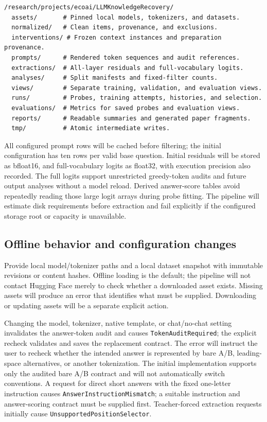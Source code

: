 \documentclass[11pt]{article}
\begin{document}
\begin{verbatim}
/research/projects/ecoai/LLMKnowledgeRecovery/
  assets/       # Pinned local models, tokenizers, and datasets.
  normalized/   # Clean items, provenance, and exclusions.
  interventions/ # Frozen context instances and preparation provenance.
  prompts/      # Rendered token sequences and audit references.
  extractions/  # All-layer residuals and full-vocabulary logits.
  analyses/     # Split manifests and fixed-filter counts.
  views/        # Separate training, validation, and evaluation views.
  runs/         # Probes, training attempts, histories, and selection.
  evaluations/  # Metrics for saved probes and evaluation views.
  reports/      # Readable summaries and generated paper fragments.
  tmp/          # Atomic intermediate writes.
\end{verbatim}
All configured prompt rows will be cached before filtering; the initial configuration has ten rows per valid base question.
Initial residuals will be stored as bfloat16, and full-vocabulary logits as float32, with execution precision also recorded.
The full logits support unrestricted greedy-token audits and future output analyses without a model reload.
Derived answer-score tables avoid repeatedly reading those large logit arrays during probe fitting.
The pipeline will estimate disk requirements before extraction and fail explicitly if the configured storage root or capacity is unavailable.

\subsection*{Offline behavior and configuration changes}

Provide local model/tokenizer paths and a local dataset snapshot with immutable revisions or content hashes.
Offline loading is the default; the pipeline will not contact Hugging Face merely to check whether a downloaded asset exists.
Missing assets will produce an error that identifies what must be supplied.
Downloading or updating assets will be a separate explicit action.

Changing the model, tokenizer, native template, or chat/no-chat setting invalidates the answer-token audit and causes \texttt{TokenAuditRequired}; the explicit recheck validates and saves the replacement contract.
The error will instruct the user to recheck whether the intended answer is represented by bare A/B, leading-space alternatives, or another tokenization.
The initial implementation supports only the audited bare A/B contract and will not automatically switch conventions.
A request for direct short answers with the fixed one-letter instruction causes \texttt{AnswerInstructionMismatch}; a suitable instruction and answer-scoring contract must be supplied first.
Teacher-forced extraction requests initially cause \texttt{UnsupportedPositionSelector}.
\end{document}
